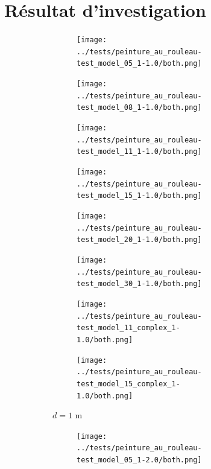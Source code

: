 \documentclass[francais,RandD]{rapportPFE}
\begin{document}
	\section{Résultat d'investigation}
		\label{annexe:resultat}
		\begin{figure}[H]
			\centering
			\begin{subfigure}[t]{\linewidth}
				\centering
				\begin{subfigure}[t]{0.12\linewidth}
					\texttt{[image: ../tests/peinture\_au\_rouleau-test\_model\_05\_1-1.0/both.png]}
				\end{subfigure}
				\hfill
				\begin{subfigure}[t]{0.11\linewidth}
					\texttt{[image: ../tests/peinture\_au\_rouleau-test\_model\_08\_1-1.0/both.png]}
				\end{subfigure}
				\hfill
				\begin{subfigure}[t]{0.11\linewidth}
					\texttt{[image: ../tests/peinture\_au\_rouleau-test\_model\_11\_1-1.0/both.png]}
				\end{subfigure}
				\hfill
				\begin{subfigure}[t]{0.11\linewidth}
					\texttt{[image: ../tests/peinture\_au\_rouleau-test\_model\_15\_1-1.0/both.png]}
				\end{subfigure}
				\hfill
				\begin{subfigure}[t]{0.11\linewidth}
					\texttt{[image: ../tests/peinture\_au\_rouleau-test\_model\_20\_1-1.0/both.png]}
				\end{subfigure}
				\hfill
				\begin{subfigure}[t]{0.11\linewidth}
					\texttt{[image: ../tests/peinture\_au\_rouleau-test\_model\_30\_1-1.0/both.png]}
				\end{subfigure}
				\hfill
				\begin{subfigure}[t]{0.11\linewidth}
					\texttt{[image: ../tests/peinture\_au\_rouleau-test\_model\_11\_complex\_1-1.0/both.png]}
				\end{subfigure}
				\hfill
				\begin{subfigure}[t]{0.11\linewidth}
					\texttt{[image: ../tests/peinture\_au\_rouleau-test\_model\_15\_complex\_1-1.0/both.png]}
				\end{subfigure}
				\caption{$d = 1$ m}
			\end{subfigure}
			\hfill
			\begin{subfigure}[t]{\linewidth}
				\centering
				\begin{subfigure}[t]{0.11\linewidth}
					\texttt{[image: ../tests/peinture\_au\_rouleau-test\_model\_05\_1-2.0/both.png]}

\end{subfigure}
\end{subfigure}
\end{figure}
\end{document}
